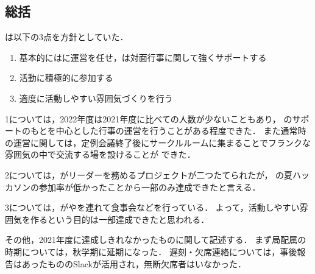 \subsection*{\thirdGrade{}総括}


\thirdGrade{}は以下の3点を方針としていた．

\begin{enumerate}
  \item 基本的には\secondGrade{}に運営を任せ，\thirdGrade{}は対面行事に関して強くサポートする
  \item 活動に積極的に参加する
  \item 適度に活動しやすい雰囲気づくりを行う
\end{enumerate}


1については，2022年度は2021年度に比べて\secondGrade{}の人数が少ないこともあり，
\thirdGrade{}のサポートのもと\secondGrade{}を中心とした行事の運営を行うことがある程度できた．
また通常時の運営に関しては，定例会議終了後にサークルルームに集まることでフランクな雰囲気の中で交流する場を設けることが
できた．

2については，\thirdGrade{}がリーダーを務めるプロジェクトが二つたてられたが，
\thirdGrade{}の夏ハッカソンの参加率が低かったことから一部のみ達成できたと言える．

3については，\thirdGrade{}が\firstGrade{}や\secondGrade{}を連れて食事会などを行っている．
よって，活動しやすい雰囲気を作るという目的は一部達成できたと思われる．


その他，2021年度に達成しきれなかったものに関して記述する．
まず局配属の時期については，秋学期に延期になった．
遅刻・欠席連絡については，事後報告はあったもののSlackが活用され，無断欠席者はいなかった．
